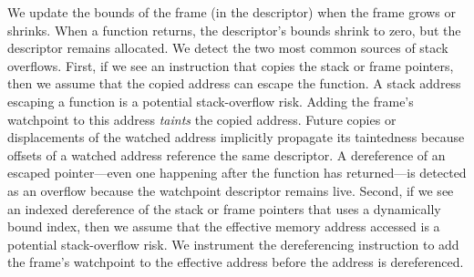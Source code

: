 \documentclass[letterpaper,twocolumn,10pt]{article}
\begin{document}
We update the bounds of the frame (in the descriptor) when the frame grows or shrinks. When a function returns, the descriptor's bounds shrink to zero, but the descriptor remains allocated. We detect the two most common sources of stack overflows. First, if we see an instruction that copies the stack or frame pointers, then we assume that the copied address can escape the function. A stack address escaping a function is a potential stack-overflow risk. Adding the frame's watchpoint to this address \emph{taints} the copied address. Future copies or displacements of the watched address implicitly propagate its taintedness because offsets of a watched address reference the same descriptor. A dereference of an escaped pointer---even one happening after the function has returned---is detected as an overflow because the watchpoint descriptor remains live. Second, if we see an indexed dereference of the stack or frame pointers that uses a dynamically bound index, then we assume that the effective memory address accessed is a potential stack-overflow risk. We instrument the dereferencing instruction to add the frame's watchpoint to the effective address before the address is dereferenced.



\end{document}
